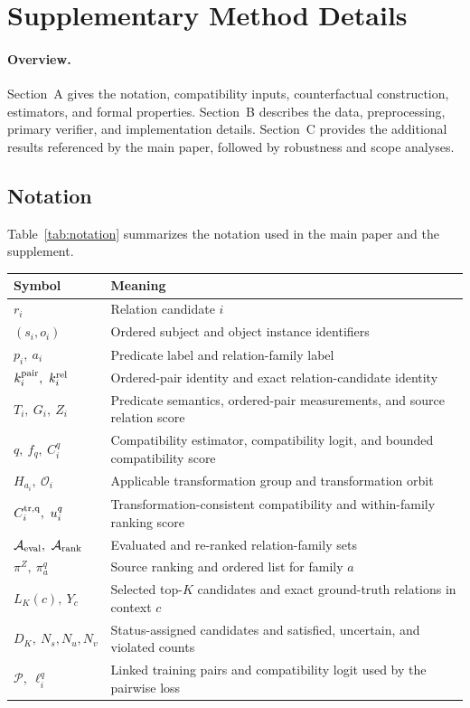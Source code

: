 \section{Supplementary Method Details}

\paragraph{Overview.}
Section~A gives the notation, compatibility inputs, counterfactual construction, estimators, and formal properties.
Section~B describes the data, preprocessing, primary verifier, and implementation details.
Section~C provides the additional results referenced by the main paper, followed by robustness and scope analyses.

\subsection{Notation}

Table~\ref{tab:notation} summarizes the notation used in the main paper and the supplement.

\begin{center}
{\small
\setlength{\tabcolsep}{3pt}
\renewcommand{\arraystretch}{1.08}
\begin{tabularx}{\columnwidth}{@{}lX@{}}
\toprule
Symbol & Meaning \\
\midrule
$r_i$ & Relation candidate $i$ \\
$(s_i,o_i)$ & Ordered subject and object instance identifiers \\
$p_i,\ a_i$ & Predicate label and relation-family label \\
$k_i^{\rm pair},\ k_i^{\rm rel}$ & Ordered-pair identity and exact relation-candidate identity \\
$T_i,\ G_i,\ Z_i$ & Predicate semantics, ordered-pair measurements, and source relation score \\
$q,\ f_q,\ C_i^q$ & Compatibility estimator, compatibility logit, and bounded compatibility score \\
$H_{a_i},\ \mathcal O_i$ & Applicable transformation group and transformation orbit \\
$C_i^{\rm tr,q},\ u_i^q$ & Transformation-consistent compatibility and within-family ranking score \\
$\mathcal A_{\rm eval},\ \mathcal A_{\rm rank}$ & Evaluated and re-ranked relation-family sets \\
$\pi^Z,\ \pi_a^q$ & Source ranking and ordered list for family $a$ \\
$L_K(c),\ Y_c$ & Selected top-$K$ candidates and exact ground-truth relations in context $c$ \\
$D_K,\ N_s,N_u,N_v$ & Status-assigned candidates and satisfied, uncertain, and violated counts \\
$\mathcal P,\ \ell_i^q$ & Linked training pairs and compatibility logit used by the pairwise loss \\
\bottomrule
\end{tabularx}
}
\label{tab:notation}
\end{center}

